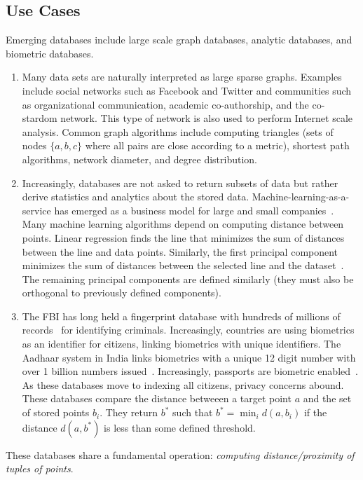 \subsection{Use Cases}
Emerging databases include large scale graph databases, analytic databases, and
biometric databases. 
\begin{enumerate}
\item Many data sets are naturally interpreted as large sparse graphs.  Examples include social networks such as Facebook and Twitter and communities such as organizational communication, academic co-authorship, and the co-stardom network.  This type of network is also used to perform Internet scale analysis.  Common graph algorithms include computing triangles (sets of nodes $\{a,b,c\}$ where all pairs are close according to a metric), shortest path algorithms, network diameter, and degree distribution.
\item  Increasingly, databases are not asked to return subsets of data but rather derive statistics and analytics about the stored data.  Machine-learning-as-a-service has emerged as a business model for large and small companies~\cite{mlservice}.  Many machine learning algorithms depend on computing distance between points. Linear regression finds the line that minimizes the sum of distances between the line and data points.  Similarly, the first principal component minimizes the sum of distances between the selected line and the dataset~\cite{wold1987principal}.  The remaining principal components are defined similarly (they must also be orthogonal to previously defined components).
\item The FBI has long held a fingerprint database with hundreds of millions of records~\cite{brislawn1996fbi} for identifying criminals.  Increasingly, countries are using biometrics as an identifier for citizens, linking biometrics with unique identifiers.  The Aadhaar system in India links biometrics with a unique 12 digit number with over 1 billion numbers issued~\cite{daugman2014600}.  Increasingly, passports are biometric enabled~\cite{stanton2008icao}.  As these databases move to indexing all citizens, privacy concerns abound.  These databases compare the distance betweeen a target point $a$ and the set of stored points $b_i$. They return $b^*$ such that $b^* = \min_i d(a,b_i)$ if the distance $d(a,b^*)$ is less than some defined threshold.  
\end{enumerate}

\noindent
These databases share a fundamental operation: {\em
computing distance/proximity of tuples of points}. 

